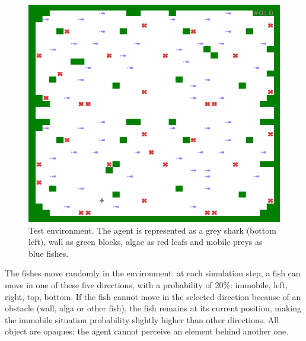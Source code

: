 \documentclass[conference]{IEEEtran}
\begin{document}
\begin{figure}[htbp]
\centerline{\includegraphics[scale=0.4]{img/environment.png}}
\caption{Test environment. The agent is represented as a grey shark (bottom left), wall as green blocks, algae as red leafs and mobile preys as blue fishes.}
\label{fig}
\end{figure}

The fishes move randomly in the environment: at each simulation step, a fish can move in one of these five directions, with a probability of 20\%: immobile, left, right, top, bottom. If the fish cannot move in the selected direction because of an obstacle (wall, alga or other fish), the fish remains at its current position, making the immobile situation probability slightly higher than other directions. All object are opaques: the agent cannot perceive an element behind another one.
\end{document}
